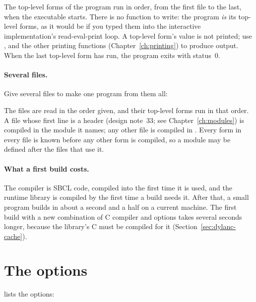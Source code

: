The top-level forms of the program run in order, from the first file to
the last, when the executable starts. There is no  function to
write: the program \emph{is} its top-level forms, as it would be if you
typed them into the interactive implementation's read-eval-print loop. A
top-level form's value is not printed; use , 
and the other printing functions (Chapter~\ref{ch:printing}) to produce
output. When the last top-level form has run, the program exits with
status~0.

\paragraph{Several files.}
Give several files to make one program from them all:


The files are read in the order given, and their top-level forms run in
that order. A file whose first line is a  header (design
note~33; see Chapter~\ref{ch:modules}) is compiled in the module it
names; any other file is compiled in . Every
 form in every file is known before any other form is
compiled, so a module may be defined after the files that use it.

\paragraph{What a first build costs.}
The compiler is SBCL code, compiled into  the first
time it is used, and the runtime library is compiled by  the
first time a build needs it. After that, a small program builds in about a
second and a half on a current machine. The first build with a new
combination of C compiler and options takes several seconds longer,
because the library's C must be compiled for it
(Section~\ref{sec:dylanc-cache}).

\section{The options}\label{sec:dylanc-options}

 lists the options:

